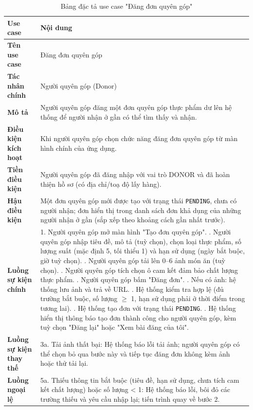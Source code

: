 \documentclass[../main.tex]{subfiles}%
\begin{document}
\begingroup
\renewcommand{\arraystretch}{1.5}
\begin{longtable}{|p{3.5cm}|p{11.5cm}|}
\caption{Bảng đặc tả use case "Đăng đơn quyên góp"}
\label{tab:usecase_dang_don_quyen_gop}\\
\hline
\textbf{Use case} & \textbf{Nội dung} \\ \hline
\textbf{Tên use case} & Đăng đơn quyên góp \\ \hline
\textbf{Tác nhân chính} & Người quyên góp (Donor) \\ \hline
\textbf{Mô tả} & Người quyên góp đăng một đơn quyên góp thực phẩm dư lên hệ thống để người nhận ở gần có thể tìm thấy và nhận. \\ \hline
\textbf{Điều kiện kích hoạt} & Khi người quyên góp chọn chức năng đăng đơn quyên góp từ màn hình chính của ứng dụng. \\ \hline
\textbf{Tiền điều kiện} & Người quyên góp đã đăng nhập với vai trò DONOR và đã hoàn thiện hồ sơ (có địa chỉ/toạ độ lấy hàng). \\ \hline
\textbf{Hậu điều kiện} & Một đơn quyên góp mới được tạo với trạng thái \texttt{PENDING}, chưa có người nhận; đơn hiển thị trong danh sách đơn khả dụng của những người nhận ở gần (sắp xếp theo khoảng cách gần nhất trước). \\ \hline
\textbf{Luồng sự kiện chính} &
1. Người quyên góp mở màn hình "Tạo đơn quyên góp". \newline
2. Người quyên góp nhập tiêu đề, mô tả (tuỳ chọn), chọn loại thực phẩm, số lượng suất (mặc định 5, tối thiểu 1) và hạn sử dụng (ngày bắt buộc, giờ tuỳ chọn). \newline
3. Người quyên góp tải lên 0--6 ảnh món ăn (tuỳ chọn). \newline
4. Người quyên góp tích chọn ô cam kết đảm bảo chất lượng thực phẩm. \newline
5. Người quyên góp bấm "Đăng đơn". \newline
6. Nếu có ảnh: hệ thống lưu ảnh và trả về URL. \newline
7. Hệ thống kiểm tra hợp lệ (đủ trường bắt buộc, số lượng $\ge$ 1, hạn sử dụng phải ở thời điểm trong tương lai). \newline
8. Hệ thống tạo đơn với trạng thái \texttt{PENDING}. \newline
9. Hệ thống hiển thị thông báo tạo đơn thành công cho người quyên góp, kèm tuỳ chọn "Đăng lại" hoặc "Xem bài đăng của tôi". \\ \hline
\textbf{Luồng sự kiện thay thế} &
3a. Tải ảnh thất bại: Hệ thống báo lỗi tải ảnh; người quyên góp có thể chọn bỏ qua bước này và tiếp tục đăng đơn không kèm ảnh hoặc thử tải lại. \\ \hline
\textbf{Luồng ngoại lệ} &
5a. Thiếu thông tin bắt buộc (tiêu đề, hạn sử dụng, chưa tích cam kết chất lượng) hoặc số lượng < 1: Hệ thống báo lỗi, bôi đỏ các trường thiếu và yêu cầu nhập lại; tiến trình quay về bước 2. \\ \hline
\end{longtable}
\endgroup
\end{document}

